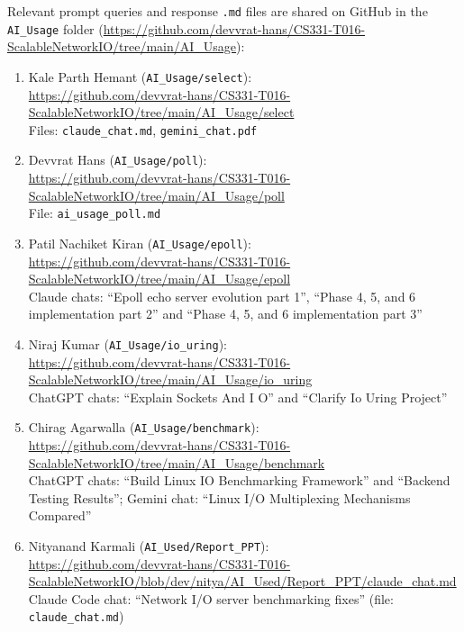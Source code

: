 \documentclass[conference,10pt]{IEEEtran}
\newcommand{\code}[1]{\texttt{#1}}
\begin{document}
\vspace{5mm}
\noindent Relevant prompt queries and response \code{.md} files are shared on GitHub in the \code{AI\_Usage} folder (\url{https://github.com/devvrat-hans/CS331-T016-ScalableNetworkIO/tree/main/AI_Usage}):
\begin{enumerate}\raggedright
\item Kale Parth Hemant (\code{AI\_Usage/select}):\\\url{https://github.com/devvrat-hans/CS331-T016-ScalableNetworkIO/tree/main/AI_Usage/select}\\
Files: \code{claude\_chat.md}, \code{gemini\_chat.pdf}
\item Devvrat Hans (\code{AI\_Usage/poll}):\\\url{https://github.com/devvrat-hans/CS331-T016-ScalableNetworkIO/tree/main/AI_Usage/poll}\\
File: \code{ai\_usage\_poll.md}
\item Patil Nachiket Kiran (\code{AI\_Usage/epoll}):\\\url{https://github.com/devvrat-hans/CS331-T016-ScalableNetworkIO/tree/main/AI_Usage/epoll}\\
Claude chats: ``Epoll echo server evolution part 1'', ``Phase 4, 5, and 6 implementation part 2'' and ``Phase 4, 5, and 6 implementation part 3''
\item Niraj Kumar (\code{AI\_Usage/io\_uring}):\\\url{https://github.com/devvrat-hans/CS331-T016-ScalableNetworkIO/tree/main/AI_Usage/io_uring}\\
ChatGPT chats: ``Explain Sockets And I O'' and ``Clarify Io Uring Project''
\item Chirag Agarwalla (\code{AI\_Usage/benchmark}):\\\url{https://github.com/devvrat-hans/CS331-T016-ScalableNetworkIO/tree/main/AI_Usage/benchmark}\\
ChatGPT chats: ``Build Linux IO Benchmarking Framework'' and ``Backend Testing Results''; Gemini chat: ``Linux I/O Multiplexing Mechanisms Compared''
\item Nityanand Karmali (\code{AI\_Used/Report\_PPT}):\\\url{https://github.com/devvrat-hans/CS331-T016-ScalableNetworkIO/blob/dev/nitya/AI_Used/Report_PPT/claude_chat.md}\\
Claude Code chat: ``Network I/O server benchmarking fixes'' (file: \code{claude\_chat.md})
\end{enumerate}
\end{document}

